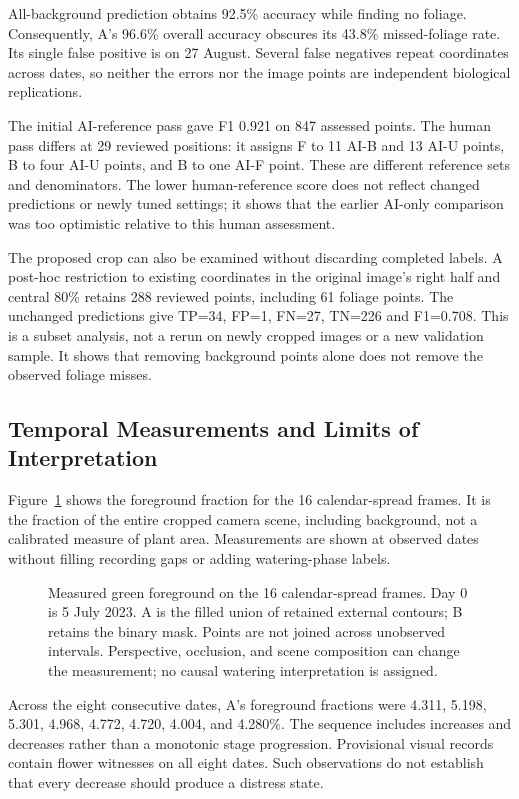 \documentclass[runningheads]{llncs}
\begin{document}
All-background prediction obtains 92.5\% accuracy while finding no foliage. Consequently, A's 96.6\% overall accuracy obscures its 43.8\% missed-foliage rate. Its single false positive is on 27 August. Several false negatives repeat coordinates across dates, so neither the errors nor the image points are independent biological replications.

The initial AI-reference pass gave F1 0.921 on 847 assessed points. The human pass differs at 29 reviewed positions: it assigns F to 11 AI-B and 13 AI-U points, B to four AI-U points, and B to one AI-F point. These are different reference sets and denominators. The lower human-reference score does not reflect changed predictions or newly tuned settings; it shows that the earlier AI-only comparison was too optimistic relative to this human assessment.

The proposed crop can also be examined without discarding completed labels. A post-hoc restriction to existing coordinates in the original image's right half and central 80\% retains 288 reviewed points, including 61 foliage points. The unchanged predictions give TP=34, FP=1, FN=27, TN=226 and F1=0.708. This is a subset analysis, not a rerun on newly cropped images or a new validation sample. It shows that removing background points alone does not remove the observed foliage misses.

\subsection{Temporal Measurements and Limits of Interpretation}
Figure~\ref{fig:coverage} shows the foreground fraction for the 16 calendar-spread frames. It is the fraction of the entire cropped camera scene, including background, not a calibrated measure of plant area. Measurements are shown at observed dates without filling recording gaps or adding watering-phase labels.

\begin{figure}[t]
\centering

\caption{Measured green foreground on the 16 calendar-spread frames. Day 0 is 5 July 2023. A is the filled union of retained external contours; B retains the binary mask. Points are not joined across unobserved intervals. Perspective, occlusion, and scene composition can change the measurement; no causal watering interpretation is assigned.}
\label{fig:coverage}
\end{figure}

Across the eight consecutive dates, A's foreground fractions were 4.311, 5.198, 5.301, 4.968, 4.772, 4.720, 4.004, and 4.280\%. The sequence includes increases and decreases rather than a monotonic stage progression. Provisional visual records contain flower witnesses on all eight dates. Such observations do not establish that every decrease should produce a distress state.
\end{document}

